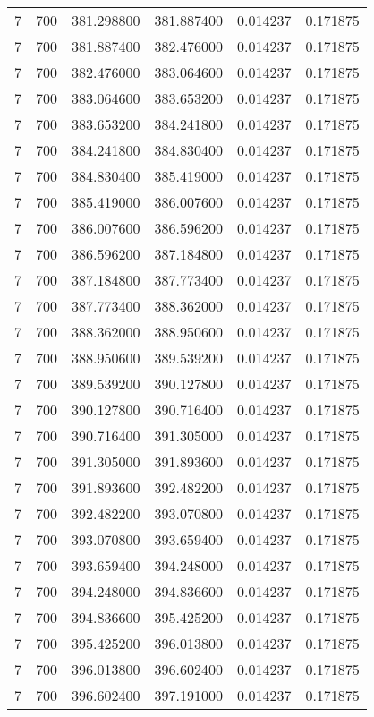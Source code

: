 \begin{longtable}{rrrrrr}
7 & 700 & 381.298800 & 381.887400 & 0.014237 & 0.171875 \\
7 & 700 & 381.887400 & 382.476000 & 0.014237 & 0.171875 \\
7 & 700 & 382.476000 & 383.064600 & 0.014237 & 0.171875 \\
7 & 700 & 383.064600 & 383.653200 & 0.014237 & 0.171875 \\
7 & 700 & 383.653200 & 384.241800 & 0.014237 & 0.171875 \\
7 & 700 & 384.241800 & 384.830400 & 0.014237 & 0.171875 \\
7 & 700 & 384.830400 & 385.419000 & 0.014237 & 0.171875 \\
7 & 700 & 385.419000 & 386.007600 & 0.014237 & 0.171875 \\
7 & 700 & 386.007600 & 386.596200 & 0.014237 & 0.171875 \\
7 & 700 & 386.596200 & 387.184800 & 0.014237 & 0.171875 \\
7 & 700 & 387.184800 & 387.773400 & 0.014237 & 0.171875 \\
7 & 700 & 387.773400 & 388.362000 & 0.014237 & 0.171875 \\
7 & 700 & 388.362000 & 388.950600 & 0.014237 & 0.171875 \\
7 & 700 & 388.950600 & 389.539200 & 0.014237 & 0.171875 \\
7 & 700 & 389.539200 & 390.127800 & 0.014237 & 0.171875 \\
7 & 700 & 390.127800 & 390.716400 & 0.014237 & 0.171875 \\
7 & 700 & 390.716400 & 391.305000 & 0.014237 & 0.171875 \\
7 & 700 & 391.305000 & 391.893600 & 0.014237 & 0.171875 \\
7 & 700 & 391.893600 & 392.482200 & 0.014237 & 0.171875 \\
7 & 700 & 392.482200 & 393.070800 & 0.014237 & 0.171875 \\
7 & 700 & 393.070800 & 393.659400 & 0.014237 & 0.171875 \\
7 & 700 & 393.659400 & 394.248000 & 0.014237 & 0.171875 \\
7 & 700 & 394.248000 & 394.836600 & 0.014237 & 0.171875 \\
7 & 700 & 394.836600 & 395.425200 & 0.014237 & 0.171875 \\
7 & 700 & 395.425200 & 396.013800 & 0.014237 & 0.171875 \\
7 & 700 & 396.013800 & 396.602400 & 0.014237 & 0.171875 \\
7 & 700 & 396.602400 & 397.191000 & 0.014237 & 0.171875 \\

\end{longtable}
